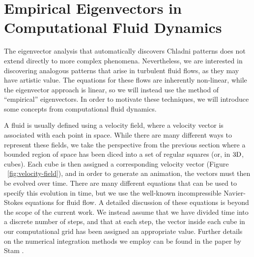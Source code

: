 \section*{Empirical Eigenvectors in Computational Fluid Dynamics}

The eigenvector analysis that automatically discovers Chladni patterns does not extend directly to more complex phenomena. Nevertheless, we are interested in discovering analogous patterns that arise in turbulent fluid flows, as they may have artistic value. The equations for these flows are inherently non-linear, while the eigenvector approach is linear, so we will instead use the method of ``empirical'' eigenvectors. In order to motivate these techniques, we will introduce some concepts from computational fluid dynamics.

A fluid is usually defined using a velocity field, where a velocity vector is associated with each point in space. While there are many different ways to represent these fields, we take the perspective from the previous section where a bounded region of space has been diced into a set of regular squares (or, in $3\textnormal{D}$, cubes). Each cube is then assigned a corresponding velocity vector (Figure ~\ref{fig:velocity-field}), and in order to generate an animation, the vectors must then be evolved over time. There are many different equations that can be used to specify this evolution in time, but we use the well-known incompressible Navier-Stokes equations for fluid flow. A detailed discussion of these equations is beyond the scope of the current work. We instead assume that we have divided time into a discrete number of steps, and that at each step, the vector inside each cube in our computational grid has been assigned an appropriate value. Further details on the numerical integration methods we employ can be found in the paper by Stam \cite{Stam99}.




